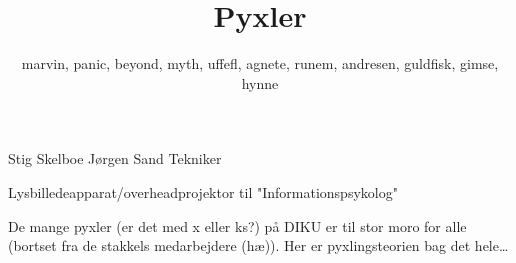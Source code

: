 \documentclass[danish]{article}
\title{Pyxler}
\author{marvin, panic, beyond, myth, uffefl, agnete, runem, andresen, guldfisk, gimse, hynne}
\begin{document}
\maketitle

\begin{roles}
   Stig Skelboe
   Jørgen Sand
   Tekniker
\end{roles}

\begin{props}
   Lysbilledeapparat/overheadprojektor
    til "Informationspsykolog"
\end{props}
                
\scene
De mange pyxler (er det med x eller ks?) på DIKU er til stor moro for alle
(bortset fra de stakkels medarbejdere (hæ)). Her er pyxlingsteorien
bag det hele\ldots
                
\end{document}
